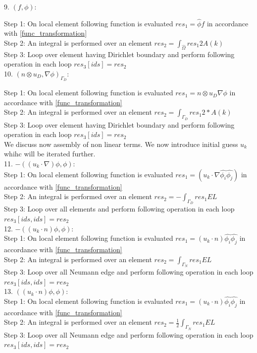 \documentclass[a4paper,12pt]{book}
\begin{document}
9. $(f,\phi) $:

Step 1: On local element following function is evaluated $res_1= \hat{\phi} f$ in accordance with \ref{func_transformation}\\
Step 2: An integral is performed over an element $res_2=\int_{\hat{\Omega}} res_1 2 A(k)$\\
Step 3: Loop over element having Dirichlet boundary and perform following operation in each loop $res_3[ids]=res_2$\\


10. $(n \otimes u_D,\nabla \phi)_{\Gamma_D} $:

Step 1: On local element following function is evaluated $res_1= n \otimes u_D  \nabla \phi$ in accordance with \ref{func_transformation}\\
Step 2: An integral is performed over an element $res_2=\int_{\Gamma_D} res_1 2*A(k)$\\
Step 3: Loop over element having Dirichlet boundary and perform following operation in each loop $res_3[ids]=res_2$\\

We discuss now assembly of non linear terms. We now introduce initial guess $u_k$ whihc will be iterated further.\\

11. $-((u_k \cdot \nabla)\phi , \phi)$:\\
Step 1: On local element following function is evaluated $res_1 = (u_k \cdot \nabla \hat{\phi_i} \hat{\phi_j}) $ in accordance with \ref{func_transformation}\\
Step 2: An integral is performed over an element $res_2= - \int_{\Gamma_D} res_1 EL$\\
Step 3: Loop over all elements and perform following operation in each loop $res_3[ids,ids]=res_2$\\

12. $-((u_k \cdot n)\phi , \phi)$:\\
Step 1: On local element following function is evaluated $res_1 = (u_k \cdot n) \hat{\phi_i} \hat{\phi_j} $ in accordance with \ref{func_transformation}\\
Step 2: An integral is performed over an element $res_2= \int_{\Gamma_N} res_1 EL $\\
Step 3: Loop over all Neumann edge and perform following operation in each loop $res_3[ids,ids]=res_2$\\

13. $((u_k \cdot n)\phi , \phi)$:\\
Step 1: On local element following function is evaluated $res_1 = (u_k \cdot n) \hat{\phi_i} \hat{\phi_j} $ in accordance with \ref{func_transformation}\\
Step 2: An integral is performed over an element $res_2 = \frac{1}{2}  \int_{\Gamma_N} res_1 EL $\\
Step 3: Loop over all Neumann edge and perform following operation in each loop $res_3[ids,ids] = res_2$\\
\end{document}
